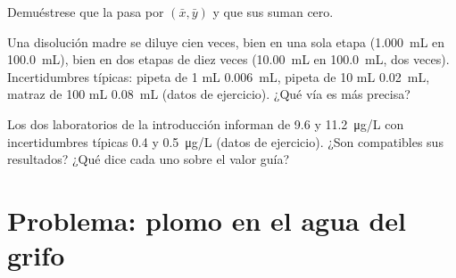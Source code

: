 \begin{exercise}[$\star\star\star$]\label{exo:b2:measurement-statistics:10}
Demuéstrese que la  pasa por $(\bar x, \bar y)$ y que sus  suman cero.
\end{exercise}

\begin{exercise}[$\star\star\star$]\label{exo:b2:measurement-statistics:11}
Una disolución madre se diluye cien veces, bien en una sola etapa (\qty{1.000}{mL} en \qty{100.0}{mL}), bien
en dos etapas de diez veces (\qty{10.00}{mL} en \qty{100.0}{mL}, dos veces). Incertidumbres típicas: pipeta de 1 mL
\qty{0.006}{mL}, pipeta de 10 mL \qty{0.02}{mL}, matraz de 100 mL \qty{0.08}{mL} (datos de ejercicio).
¿Qué vía es más precisa?
\end{exercise}

\begin{exercise}[$\star\star\star$]\label{exo:b2:measurement-statistics:12}
Los dos laboratorios de la introducción informan de 9.6 y \qty{11.2}{\micro g/L} con incertidumbres típicas
0.4 y \qty{0.5}{\micro g/L} (datos de ejercicio). ¿Son compatibles sus resultados? ¿Qué dice cada uno sobre el
valor guía?
\end{exercise}

\section{Problema: plomo en el agua del grifo}

